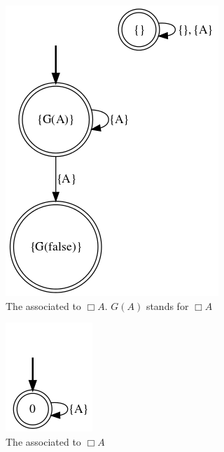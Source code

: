 \begin{example}
	\begin{figure}[h!]
		\centering
		\includegraphics[width=.4\linewidth]{images/ltlf-alwaysA-nfa}
		\caption{The \NFA associated to $\Box A$.  $G(A)$ stands for $\Box A$}\label{fig:nfa-always-a}
	\end{figure}
	\begin{figure}[h!]
		\centering
		\includegraphics[width=.2\linewidth]{images/ltlf-alwaysA-dfa}
		\caption{The \DFA associated to $\Box A$}\label{fig:dfa-always-a}
	\end{figure}

	
\end{example}
